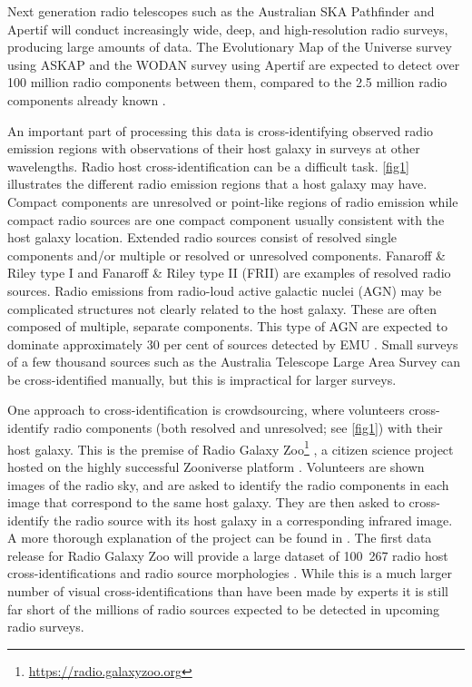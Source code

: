 \documentclass[fleqn,usenatbib,usedcolumn]{mnras}
\begin{document}
  Next generation radio telescopes such as the Australian SKA Pathfinder
  \citep[ASKAP;][]{johnston07} and Apertif \citep{verheijen08} will conduct
  increasingly wide, deep, and high-resolution radio surveys, producing large
  amounts of data. The Evolutionary Map of the Universe survey
  \citep[EMU;][]{norris11} using ASKAP and the WODAN survey
  \citep{rottgering11} using Apertif are expected to detect over 100 million
  radio components between them, compared to the 2.5 million radio components
  already known \citep{banfield15}.

  An important part of processing this data is cross-identifying observed
  radio emission regions with observations of their host galaxy in surveys at
  other wavelengths. Radio host cross-identification can be a difficult task.
  \autoref{fig1} illustrates the different radio emission regions that a host
  galaxy may have. Compact components are unresolved or point-like regions of
  radio emission while compact radio sources are one compact component usually
  consistent with the host galaxy location. Extended radio sources consist of
  resolved single components and/or multiple or resolved or unresolved
  components. Fanaroff \& Riley type I \citep[FRI; ][]{Fanaroff1974} and
  Fanaroff \& Riley type II (FRII) are examples of resolved radio sources.
  Radio emissions from radio-loud active galactic nuclei (AGN) may be
  complicated structures not clearly related to the host galaxy. These are
  often composed of multiple, separate components. This type of AGN are
  expected to dominate approximately 30 per cent of sources detected by EMU
  \citep{norris11}. Small surveys of a few thousand sources such as the
  Australia Telescope Large Area Survey
  \citep[ATLAS;][]{norris06,middelberg08} can be cross-identified manually,
  but this is impractical for larger surveys.

  One approach to cross-identification is crowdsourcing, where volunteers
  cross-identify radio components (both resolved and unresolved; see
  \autoref{fig1}) with their host galaxy. This is the premise of Radio Galaxy
  Zoo\footnote{\url{https://radio.galaxyzoo.org}} \citep{banfield15}, a
  citizen science project hosted on the highly successful Zooniverse platform
  \citep{lintott08}. Volunteers are shown images of the radio sky, and are
  asked to identify the radio components in each image that correspond to the
  same host galaxy. They are then asked to cross-identify the radio source
  with its host galaxy in a corresponding infrared image. A more thorough
  explanation of the project can be found in \citet{banfield15}. The first
  data release for Radio Galaxy Zoo will provide a large dataset of 100~267
  radio host cross-identifications and radio source morphologies
  \citep{wong17}. While this is a much larger number of visual
  cross-identifications than have been made by experts \citep[e.g.,
  ][]{Taylor2007,Gendre2008,Grant2010,norris06,middelberg08} it is still far
  short of the millions of radio sources expected to be detected in upcoming
  radio surveys.
\end{document}
